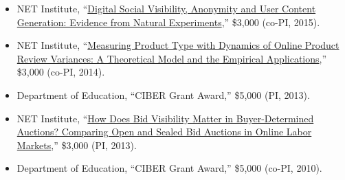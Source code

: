\documentclass[paper=letter,fontsize=10pt]{scrartcl} %
\newcommand{\FundingEntry}[5]{
        \noindent #1, ``#2,'' \$#3 (#4, #5).}
\begin{document}
\begin{itemize}
\item \FundingEntry {NET Institute}{\href{http://www.netinst.org/Huang_Hong_Burtch_15-04.pdf}{Digital Social Visibility, Anonymity and User Content Generation: Evidence from Natural Experiments}}{3,000}{co-PI}{2015}
\item \FundingEntry {NET Institute}{\href{http://www.netinst.org/Hong_14-03.pdf}{Measuring Product Type with Dynamics of Online Product Review Variances: A Theoretical Model and the Empirical Applications}}{3,000}{co-PI}{2014}
\item \FundingEntry {Department of Education}{CIBER Grant Award}{5,000}{PI}{2013}
\item \FundingEntry {NET Institute}{\href{http://www.netinst.org/Hong_Wang_13-05.pdf}{How Does Bid Visibility Matter in Buyer-Determined Auctions? Comparing Open and Sealed Bid Auctions in Online Labor Markets}}{3,000}{PI}{2013}
\item \FundingEntry {Department of Education}{CIBER Grant Award}{5,000}{co-PI}{2010}
\end{itemize}


\end{document}
